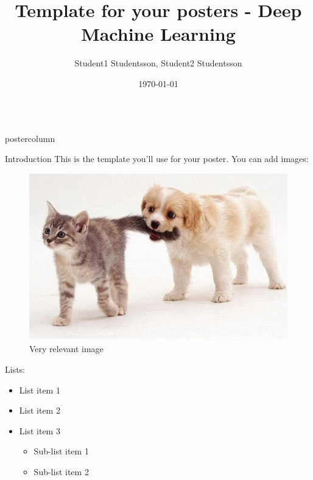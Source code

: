 \documentclass{beamer}
\title{\huge Template for your posters - Deep Machine Learning}
\author{Student1 Studentsson, Student2 Studentsson}
\institute[Chalmers]{Chalmers University of Technology \\ Electrical Engineering Department}
\date{\today}
\newlength{\columnheight}
\begin{document}
\begin{frame}
\begin{columns}
	\begin{column}{.43\textwidth}
		\begin{beamercolorbox}[center]{postercolumn}
			\begin{minipage}{.98\textwidth}  %
				\parbox[t][\columnheight]{\textwidth}{
					\begin{myblock}{Introduction}
				        This is the template you'll use for your poster. You can add images:
				    
				        \begin{figure}
				            \centering
				            \includegraphics{img/love-is-real-cats-and-dogs-4.jpg}
				            \caption{Very relevant image}
				            \label{fig:my_label}
				        \end{figure}
				        
				        Lists:
				        
				        \begin{itemize}
				            \item List item 1
				            \item List item 2
				            \item List item 3
				            \begin{itemize}
				                \item Sub-list item 1
				                \item Sub-list item 2
				            \end{itemize}
				        \end{itemize}
				        

\end{myblock}}
\end{minipage}
\end{beamercolorbox}
\end{column}
\end{columns}
\end{frame}
\end{document}
